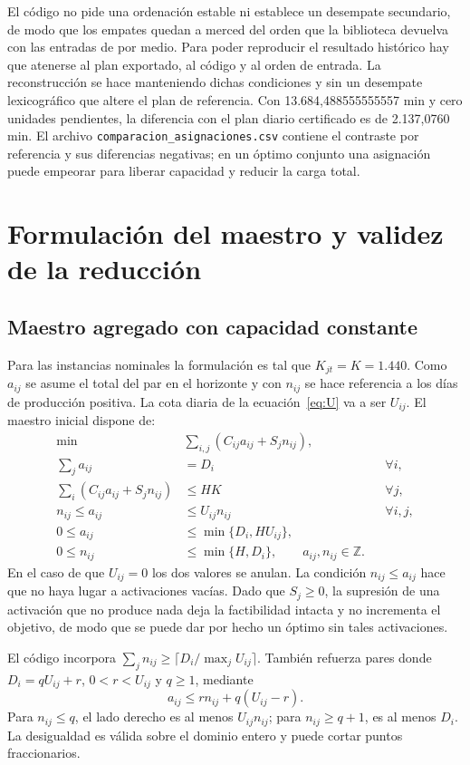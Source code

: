 El código no pide una ordenación estable ni establece un desempate secundario, de modo que los empates quedan a merced del orden que la biblioteca devuelva con las entradas de por medio. Para poder reproducir el resultado histórico hay que atenerse al plan exportado, al código y al orden de entrada. La reconstrucción se hace manteniendo dichas condiciones y sin un desempate lexicográfico que altere el plan de referencia. Con 13.684,488555555557 min y cero unidades pendientes, la diferencia con el plan diario certificado es de 2.137,0760 min. El archivo \texttt{comparacion\_asignaciones.csv} contiene el contraste por referencia y sus diferencias negativas; en un óptimo conjunto una asignación puede empeorar para liberar capacidad y reducir la carga total.

\clearpage
\section{Formulación del maestro y validez de la reducción}\label{an:maestro}
\subsection{Maestro agregado con capacidad constante}
Para las instancias nominales la formulación es tal que $K_{jt}=K=1.440$. Como $a_{ij}$ se asume el total del par en el horizonte y con $n_{ij}$ se hace referencia a los días de producción positiva. La cota diaria de la ecuación~\eqref{eq:U} va a ser $U_{ij}$. El maestro inicial dispone de:
\begin{align}
\min\quad &\sum_{i,j}(C_{ij}a_{ij}+S_jn_{ij}),\\
\sum_j a_{ij}&=D_i &&\forall i,\\
\sum_i(C_{ij}a_{ij}+S_jn_{ij})&\leq HK &&\forall j,\\
n_{ij}\leq a_{ij}&\leq U_{ij}n_{ij} &&\forall i,j,\\
0\leq a_{ij}&\leq\min\{D_i,HU_{ij}\},\\
0\leq n_{ij}&\leq\min\{H,D_i\},\qquad a_{ij},n_{ij}\in\mathbb Z.
\end{align}
En el caso de que $U_{ij}=0$ los dos valores se anulan. La condición $n_{ij}\leq a_{ij}$ hace que no haya lugar a activaciones vacías. Dado que $S_j\geq0$, la supresión de una activación que no produce nada deja la factibilidad intacta y no incrementa el objetivo, de modo que se puede dar por hecho un óptimo sin tales activaciones.

El código incorpora $\sum_j n_{ij}\geq\lceil D_i/\max_jU_{ij}\rceil$. También refuerza pares donde $D_i=qU_{ij}+r$, $0<r<U_{ij}$ y $q\geq1$, mediante
\[
a_{ij}\leq rn_{ij}+q(U_{ij}-r).
\]
Para $n_{ij}\leq q$, el lado derecho es al menos $U_{ij}n_{ij}$; para $n_{ij}\geq q+1$, es al menos $D_i$. La desigualdad es válida sobre el dominio entero y puede cortar puntos fraccionarios.

